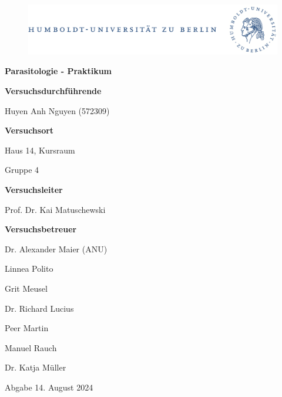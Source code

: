 \documentclass[oneside,10pt,a4paper]{report}
\begin{document}
	
	\begin{titlepage}
		\begin{center}
			\begin{figure}[h!tbp]
				\includegraphics[width=\linewidth]{HUlogo.PNG}
			\end{figure}
			\vspace*{2 cm}
			
			\textcolor{Bluetitle}{\textbf{\huge Parasitologie - Praktikum}}\par
			
			\vspace*{2cm}
			\textcolor{Greyish}{\textbf{Versuchsdurchführende}}\par
			\textcolor{Greyish}{Huyen Anh Nguyen (572309)}\par

			\vspace*{0.5cm}
			\textcolor{Greyish}{\textbf{Versuchsort}}\par
			\textcolor{Greyish}{Haus 14, Kursraum}\par
			\textcolor{Greyish}{Gruppe 4}\par

			
			\vspace*{2 cm}
			\textcolor{Greyish}{\textbf{Versuchsleiter}}\par
			\textcolor{Greyish}{Prof. Dr. Kai Matuschewski}\par
			\vspace*{0.5cm}
			\textcolor{Greyish}{\textbf{Versuchsbetreuer}}\par
			\textcolor{Greyish}{Dr. Alexander Maier (ANU)}\par
			\textcolor{Greyish}{Linnea Polito}\par
			\textcolor{Greyish}{Grit Meusel}\par
			\textcolor{Greyish}{Dr. Richard Lucius}\par
			\textcolor{Greyish}{Peer Martin}\par
			\textcolor{Greyish}{Manuel Rauch}\par
			\textcolor{Greyish}{Dr. Katja Müller}\par

			\vspace*{2 cm}
			\textcolor{Greyish}{Abgabe 14. August 2024}\par
			
			
			
		\end{center}
	\end{titlepage}
\end{document}
